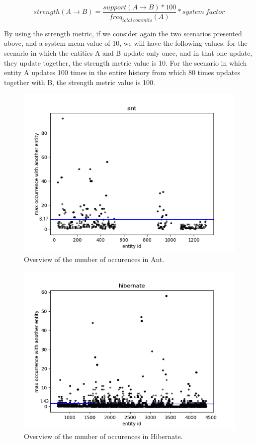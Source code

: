 \documentclass[runningheads]{comsis2}
\begin{document}
\begin{equation}
 strength (A \rightarrow B) =\frac{support (A \rightarrow B) * 100}{freq_{total\ commits}(A)} * system\ factor
\end{equation}

By using the strength metric, if we consider again the two scenarios presented above, and a system mean value of 10, we will have the following values: for the scenario in which the entities A and B update only once, and in that one update, they update together, the strength metric value is 10. For the scenario in which entity A updates 100 times in the entire history from which 80 times updates together with B, the strength metric value is 100.  

\begin{figure}
\centering
\includegraphics[scale=0.7]{fig_ant_maxOcc.png}
\caption{Overview of the number of occurences in Ant. }
\label{fig:strength_overview_ant}
\centering
\end{figure}

\begin{figure}
\centering
\includegraphics[scale=0.7]{fig_hibernate_maxOcc.png}
\caption{Overview of the number of occurences in Hibernate. }
\label{fig:strength_overview_hibernate}
\centering
\end{figure}
\end{document}
